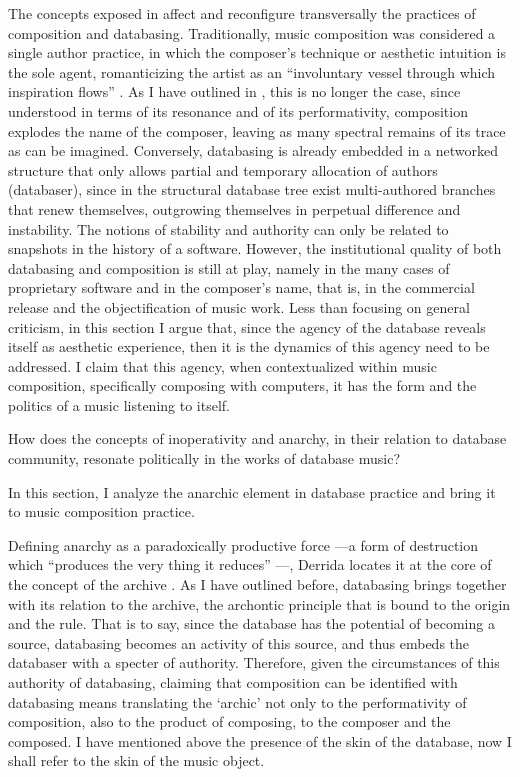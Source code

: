 The concepts exposed in  affect and reconfigure transversally the practices of composition and databasing. Traditionally, music composition was considered a single author practice, in which the composer's technique or aesthetic intuition is the sole agent, romanticizing the artist as an ``involuntary vessel through which inspiration flows'' \parencite{Bor95:Rat}. As I have outlined in , this is no longer the case, since understood in terms of its resonance and of its performativity, composition explodes the name of the composer, leaving as many spectral remains of its trace as can be imagined. Conversely, databasing is already embedded in a networked structure that only allows partial and temporary allocation of authors (databaser), since in the structural database tree exist multi-authored branches that renew themselves, outgrowing themselves in perpetual difference and instability. The notions of stability and authority can only be related to snapshots in the history of a software. However, the institutional quality of both databasing and composition is still at play, namely in the many cases of proprietary software and in the composer's name, that is, in the commercial release and the objectification of music work. Less than focusing on general criticism, in this section I argue that, since the agency of the database reveals itself as aesthetic experience, then it is the dynamics of this agency need to be addressed. I claim that this agency, when contextualized within music composition, specifically composing with computers, it has the form and the politics of a music listening to itself. 




How does the concepts of inoperativity and anarchy, in their relation to database community, resonate politically in the works of database music?

In this section, I analyze the anarchic element in database practice and bring it to music composition practice. 

Defining anarchy as a paradoxically productive force ---a form of destruction which ``produces the very thing it reduces'' \parencite{Der95:Arc}---, Derrida locates it at the core of the concept of the archive . As I have outlined before, databasing brings together with its relation to the archive, the archontic principle that is bound to the origin and the rule. That is to say, since the database has the potential of becoming a source, databasing becomes an activity of this source, and thus embeds the databaser with a specter of authority. Therefore, given the circumstances of this authority of databasing, claiming that composition can be identified with databasing means translating the `archic' not only to the performativity of composition, also to the product of composing, to the composer and the composed. I have mentioned above the presence of the skin of the database, now I shall refer to the skin of the music object. 


